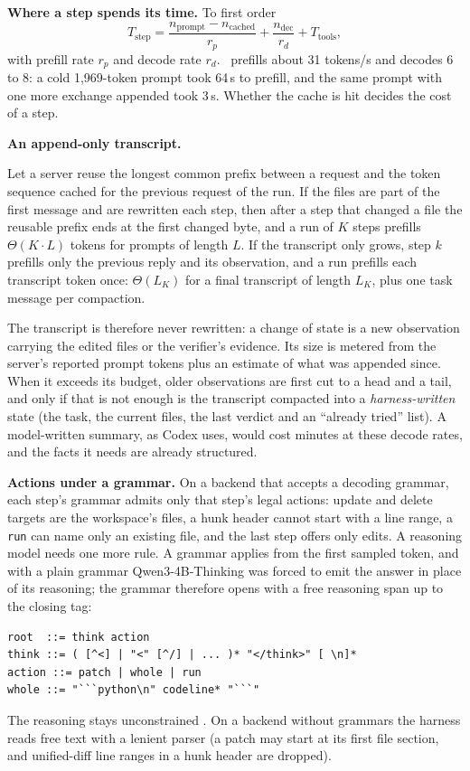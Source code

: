 \textbf{Where a step spends its time.} To first order
\begin{equation}
T_{\text{step}} = \frac{n_{\text{prompt}}-n_{\text{cached}}}{r_p} + \frac{n_{\text{dec}}}{r_d} + T_{\text{tools}},
\label{eq:stepcost}
\end{equation}
with prefill rate $r_p$ and decode rate $r_d$. \Stwo\ prefills about 31
tokens/s and decodes 6 to 8: a cold 1{,}969-token prompt took 64\,s to
prefill, and the same prompt with one more exchange appended took 3\,s.
Whether the cache is hit decides the cost of a step.

\textbf{An append-only transcript.}
\begin{proposition}\label{prop:prefix}
Let a server reuse the longest common prefix between a request and the token
sequence cached for the previous request of the run. If the files are part of
the first message and are rewritten each step, then after a step that changed
a file the reusable prefix ends at the first changed byte, and a run of $K$
steps prefills $\Theta(K\cdot L)$ tokens for prompts of length $L$. If the
transcript only grows, step $k$ prefills only the previous reply and its
observation, and a run prefills each transcript token once: $\Theta(L_K)$ for
a final transcript of length $L_K$, plus one task message per compaction.
\end{proposition}
The transcript is therefore never rewritten: a change of state is a new
observation carrying the edited files or the verifier's evidence. Its size is
metered from the server's reported prompt tokens plus an estimate of what was
appended since. When it exceeds its budget, older observations are first cut
to a head and a tail, and only if that is not enough is the transcript
compacted into a \emph{harness-written} state (the task, the current files,
the last verdict and an ``already tried'' list). A model-written summary, as
Codex uses, would cost minutes at these decode rates, and the facts it needs
are already structured.

\textbf{Actions under a grammar.} On a backend that accepts a decoding
grammar, each step's grammar admits only that step's legal actions: update and
delete targets are the workspace's files, a hunk header cannot start with a
line range, a \texttt{run} can name only an existing file, and the last step
offers only edits. A reasoning model needs one more rule. A grammar applies
from the first sampled token, and with a plain grammar Qwen3-4B-Thinking was
forced to emit the answer in place of its reasoning; the grammar therefore
opens with a free reasoning span up to the closing tag:
\begin{lstlisting}
root  ::= think action
think ::= ( [^<] | "<" [^/] | ... )* "</think>" [ \n]*
action ::= patch | whole | run
whole ::= "```python\n" codeline* "```"
\end{lstlisting}
The reasoning stays unconstrained \cite{tam2024speakfreely}. On a backend
without grammars the harness reads free text with a lenient parser (a patch
may start at its first file section, and unified-diff line ranges in a hunk
header are dropped).

